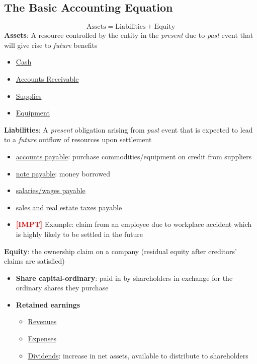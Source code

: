 \documentclass{article}
\newcommand{\impt}[0]{\textcolor{red}{\textbf{[IMPT] }}}
\begin{document}
\begin{multicols}{2}
\subsection{The Basic Accounting Equation}
$$\text{Assets} = \text{Liabilities} + \text{Equity}$$
\textbf{Assets}:  A resource controlled by the entity in the \textit{present} due to \textit{past} event that will give rise to \textit{future} benefits
	\begin{itemize}
		\item \underline{Cash}
		\item \underline{Accounts Receivable}
		\item \underline{Supplies}
		\item \underline{Equipment}
	\end{itemize}
\textbf{Liabilities}: A \textit{present} obligation arising from \textit{past} event that is expected to lead to a \textit{future} outflow of resources upon settlement
	 \begin{itemize}
	 	\item \underline{accounts payable}: purchase commodities/equipment on credit from suppliers
	 	\item \underline{note payable}: money borrowed
	 	\item \underline{salaries/wages payable}
	 	\item \underline{sales and real estate taxes payable}
	 	\item \impt Example: claim from an employee due to workplace accident which is highly likely to be settled in the future
	 \end{itemize}
\textbf{Equity}: the ownership claim on a company (residual equity after creditors' claims are satisfied)
	 \begin{itemize}
	 	\item \textbf{Share capital-ordinary}: paid in by shareholders in exchange for the ordinary shares they purchase
	 	\item \textbf{Retained earnings}
	 	\begin{itemize}
	 		\item \underline{Revenues}
	 		\item \underline{Expenses}
	 		\item \underline{Dividends}: increase in net assets, available to distribute to shareholders
	 	\end{itemize}
	 \end{itemize}


\end{multicols}
\end{document}
